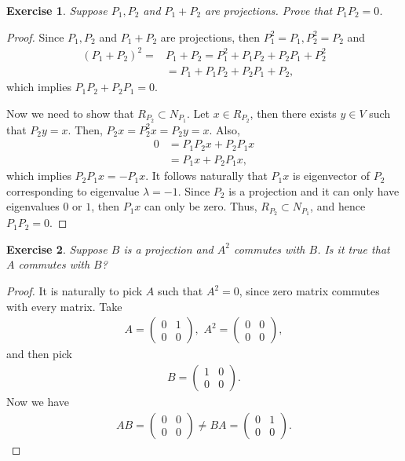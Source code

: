 \documentclass[11pt]{book}
\newtheorem{exercise}{Exercise}[section]
\theoremstyle{definition}
\numberwithin{equation}{subsection}
\begin{document}
\medskip

\begin{exercise}
Suppose $P_1, P_2$ and $P_1 + P_2$ are projections. Prove that $P_1 P_2 = 0$.
\end{exercise}
\begin{proof}
Since $P_1, P_2$ and $P_1 + P_2$ are projections, then $P_1^2 = P_1, P_2^2 = P_2$ and 
\begin{align*}
    \left(P_1 + P_2\right)^2 = & P_1 + P_2 = P_1^2 + P_1 P_2 + P_2 P_1 + P_2^2 \\
    & = P_1 + P_1 P_2 + P_2 P_1 + P_2,
\end{align*}
which implies $P_1 P_2 + P_2 P_1 = 0$. 

Now we need to show that $R_{P_2} \subset N_{P_1}$. Let $x \in R_{P_2}$, then there exists $y \in V$ such that $P_2 y = x$. Then, $P_2 x = P_2^2 x = P_2 y = x$. Also,
\begin{align*}
    0 & = P_1 P_2 x + P_2 P_1 x \\
      & = P_1 x + P_2 P_1 x,
\end{align*}
which implies $P_2 P_1 x = - P_1 x$. It follows naturally that $P_1 x$ is eigenvector of $P_2$ corresponding to eigenvalue $\lambda  = -1$. Since $P_2$ is a projection and it can only have eigenvalues $0$ or $1$, then $P_1 x$ can only be zero. Thus, $R_{P_2} \subset N_{P_1}$, and hence $P_1 P_2 = 0$.
\end{proof}

\medskip

\begin{exercise}
Suppose $B$ is a projection and $A^2$ commutes with $B$. Is it true that $A$ commutes with $B$?
\end{exercise}
\begin{proof}
It is naturally to pick $A$ such that $A^2 = 0$, since zero matrix commutes with every matrix. Take
\begin{align*}
    A = \begin{pmatrix}
        0 & 1 \\
        0 & 0
    \end{pmatrix},\,\, A^2 = \begin{pmatrix}
        0 & 0 \\
        0 & 0
    \end{pmatrix},
\end{align*}
and then pick 
\begin{align*}
    B = \begin{pmatrix}
        1 & 0 \\
        0 & 0
    \end{pmatrix}.
\end{align*}
Now we have
\begin{align*}
    AB = \begin{pmatrix}
        0 & 0 \\
        0 & 0
    \end{pmatrix} \neq BA = \begin{pmatrix}
        0 & 1 \\
        0 & 0
    \end{pmatrix}.
\end{align*}
\end{proof}
\end{document}
